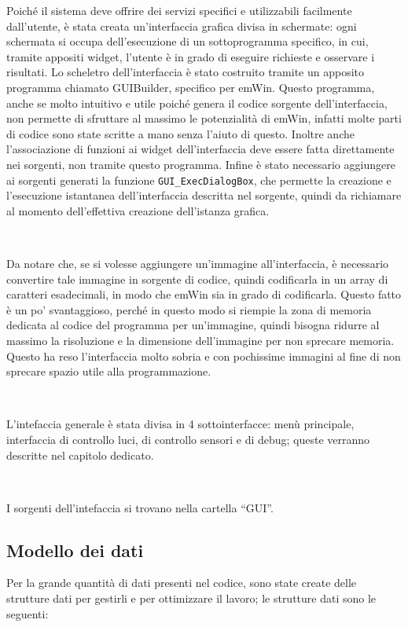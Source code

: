 \documentclass[a4paper,titlepage]{book}
\newcommand{\code}{\lstinline}
\begin{document}
Poiché il sistema deve offrire dei servizi specifici e utilizzabili facilmente dall'utente, è stata creata un'interfaccia grafica divisa in schermate: ogni schermata si occupa dell'esecuzione di un sottoprogramma specifico, in cui, tramite appositi widget, l'utente è in grado di eseguire richieste e osservare i risultati. Lo scheletro dell'interfaccia è stato costruito tramite un apposito programma chiamato GUIBuilder, specifico per emWin. Questo programma, anche se molto intuitivo e utile poiché genera il codice sorgente dell'interfaccia, non permette di sfruttare al massimo le potenzialità di emWin, infatti molte parti di codice sono state scritte a mano senza l'aiuto di questo. Inoltre anche l'associazione di funzioni ai widget dell'interfaccia deve essere fatta direttamente nei sorgenti, non tramite questo programma. Infine è stato necessario aggiungere ai sorgenti generati la funzione \code!GUI_ExecDialogBox!, che permette la creazione e l'esecuzione istantanea dell'interfaccia descritta nel sorgente, quindi da richiamare al momento dell'effettiva creazione dell'istanza grafica.

~

Da notare che, se si volesse aggiungere un'immagine all'interfaccia, è necessario convertire tale immagine in sorgente di codice, quindi codificarla in un array di caratteri esadecimali, in modo che emWin sia in grado di codificarla. Questo fatto è un po' svantaggioso, perché in questo modo si riempie la zona di memoria dedicata al codice del programma per un'immagine, quindi bisogna ridurre al massimo la risoluzione e la dimensione dell'immagine per non sprecare memoria. Questo ha reso l'interfaccia molto sobria e con pochissime immagini al fine di non sprecare spazio utile alla programmazione.

~

L'intefaccia generale è stata divisa in 4 sottointerfacce: menù principale, interfaccia di controllo luci, di controllo sensori e di debug; queste verranno descritte nel capitolo dedicato.

~

I sorgenti dell'intefaccia si trovano nella cartella ``GUI''.

\subsection{Modello dei dati}

Per la grande quantità di dati presenti nel codice, sono state create delle strutture dati per gestirli e per ottimizzare il lavoro; le strutture dati sono le seguenti:
\end{document}
